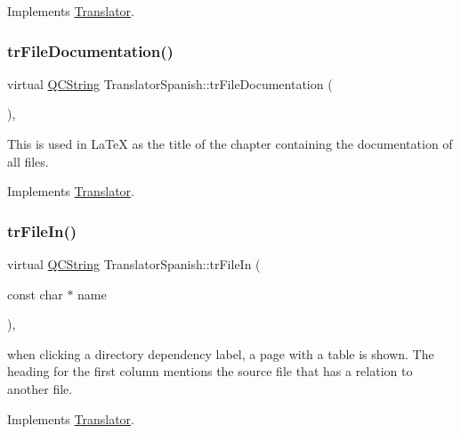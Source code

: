 Implements \mbox{\hyperlink{class_translator}{Translator}}.

\mbox{\label{class_translator_spanish_adbaeb47578c683bb45c519b9ba916623}} 
\subsubsection{\texorpdfstring{trFileDocumentation()}{trFileDocumentation()}}
{\footnotesize\ttfamily virtual \mbox{\hyperlink{class_q_c_string}{Q\+C\+String}} Translator\+Spanish\+::tr\+File\+Documentation (\begin{DoxyParamCaption}{ }\end{DoxyParamCaption})\hspace{0.3cm}{\ttfamily [inline]}, {\ttfamily [virtual]}}

This is used in La\+TeX as the title of the chapter containing the documentation of all files. 

Implements \mbox{\hyperlink{class_translator}{Translator}}.

\mbox{\label{class_translator_spanish_a114e6766f43498e1897a7ceb6087b039}} 
\subsubsection{\texorpdfstring{trFileIn()}{trFileIn()}}
{\footnotesize\ttfamily virtual \mbox{\hyperlink{class_q_c_string}{Q\+C\+String}} Translator\+Spanish\+::tr\+File\+In (\begin{DoxyParamCaption}\item[{const char $\ast$}]{name }\end{DoxyParamCaption})\hspace{0.3cm}{\ttfamily [inline]}, {\ttfamily [virtual]}}

when clicking a directory dependency label, a page with a table is shown. The heading for the first column mentions the source file that has a relation to another file. 

Implements \mbox{\hyperlink{class_translator}{Translator}}.

\mbox{\label{class_translator_spanish_ad120be41dc99a2f03f4bd41178733d72}} 
